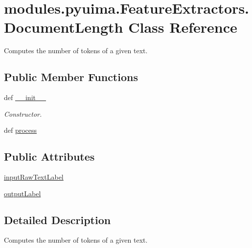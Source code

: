 \hypertarget{classmodules_1_1pyuima_1_1FeatureExtractors_1_1DocumentLength}{\section{modules.\-pyuima.\-Feature\-Extractors.\-Document\-Length \-Class \-Reference}
\label{classmodules_1_1pyuima_1_1FeatureExtractors_1_1DocumentLength}
}


\-Computes the number of tokens of a given text.  


\subsection*{\-Public \-Member \-Functions}
\begin{DoxyCompactItemize}
\item 
def \hyperlink{classmodules_1_1pyuima_1_1FeatureExtractors_1_1DocumentLength_ad2729bc7fd6da020dd7437b96930f876}{\-\_\-\-\_\-init\-\_\-\-\_\-}
\begin{DoxyCompactList}\small\item\em \-Constructor. \end{DoxyCompactList}\item 
def \hyperlink{classmodules_1_1pyuima_1_1FeatureExtractors_1_1DocumentLength_af77b99e4e44362b05c564ffc5a1698a0}{process}
\end{DoxyCompactItemize}
\subsection*{\-Public \-Attributes}
\begin{DoxyCompactItemize}
\item 
\hyperlink{classmodules_1_1pyuima_1_1FeatureExtractors_1_1DocumentLength_a4e677ab482f5845ce41fe028dbb30d55}{input\-Raw\-Text\-Label}
\item 
\hyperlink{classmodules_1_1pyuima_1_1FeatureExtractors_1_1DocumentLength_a77bb7acfcb8deb82640d783064799d95}{output\-Label}
\end{DoxyCompactItemize}


\subsection{\-Detailed \-Description}
\-Computes the number of tokens of a given text. 

